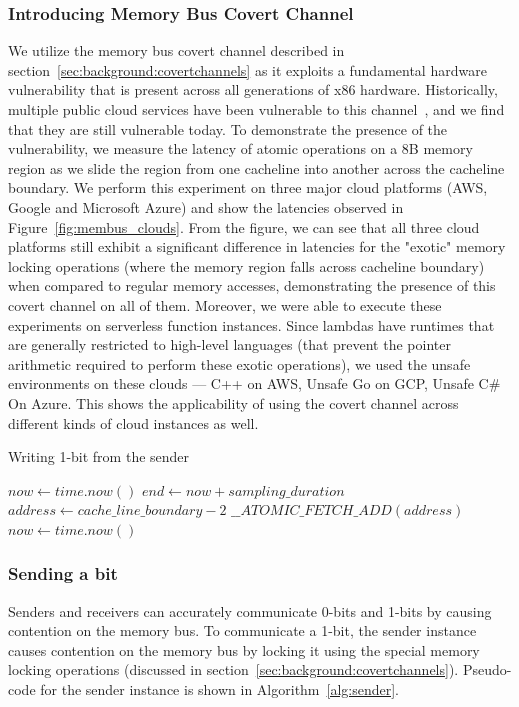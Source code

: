 \subsubsection{Introducing Memory Bus Covert Channel}
We utilize the memory bus covert channel described in
section~\ref{sec:background:covertchannels} as it exploits a fundamental
hardware vulnerability that is present across all generations of x86 hardware.
Historically, multiple public cloud services have been vulnerable to this
channel~\cite{varad191016,zhang2016}, and we find that they are still
vulnerable today. To demonstrate the presence of the vulnerability, we measure
the latency of atomic operations on a 8B memory region as we slide the region
from one cacheline into another across the cacheline boundary. We perform this
experiment on three major cloud platforms (AWS, Google and Microsoft Azure) and
show the latencies observed in Figure~\ref{fig:membus_clouds}. From the figure,
we can see that all three cloud platforms still exhibit a significant difference
in latencies for the "exotic" memory locking operations (where the memory region
falls across cacheline boundary) when compared to regular memory accesses,
demonstrating the presence of this covert channel on all of them. Moreover, we
were able to execute these experiments on serverless function instances. Since
lambdas have runtimes that are generally restricted to high-level languages
(that prevent the pointer arithmetic required to perform these exotic
operations), we used the unsafe environments on these clouds --- C++ on AWS,
Unsafe Go on GCP, Unsafe C\# On Azure. This shows the applicability of using the
covert channel across different kinds of cloud instances as well.

\begin{algorithm}[!t]
\caption{Writing 1-bit from the sender}
\label{alg:sender}
\begin{algorithmic}
\STATE $now \leftarrow  time.now()$
\STATE $end \leftarrow now + sampling\_duration$
\STATE $address \leftarrow cache\_line\_boundary-2$
    \STATE $\_\_ATOMIC\_FETCH\_ADD(address)$
    \STATE $now \leftarrow  time.now()$
\ENDWHILE
\end{algorithmic}
\end{algorithm}

\subsubsection{Sending a bit}
Senders and receivers can accurately communicate 0-bits and 1-bits
by causing contention on the memory bus. To communicate a 1-bit, the sender 
instance causes contention on the memory bus by locking it using the special memory locking operations
(discussed in section~\ref{sec:background:covertchannels}). 
Pseudo-code for the sender instance is shown in Algorithm~\ref{alg:sender}.

